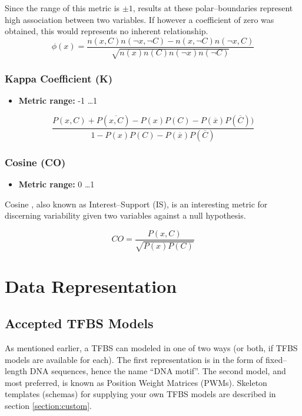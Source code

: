 \documentclass{article}
\begin{document}
Since the range of this metric is $\pm1$, 
results at these polar--boundaries represent high association between two variables. 
If however a coefficient of zero was obtained, this would represents no inherent relationship.
\begin{equation}
	\phi(x) = \frac{n(x,C)n(\neg{x},\neg{C}) - n(x,\neg{C})n(\neg{x},C)} %
		{\sqrt{n(x)n(C)n(\neg{x})n(\neg{C})}} %
\end{equation}

\subsubsection{Kappa Coefficient (K)}
\begin{itemize}
  \item \textbf{Metric range:} -1 \ldots 1
\end{itemize}

\begin{equation}
	\frac{P(x,C)+P(\overline{x,C}) - P(x)P(C) -
        P(\overline{x})P(\overline{C}))}
        {1-P(x)P(C) - P(\overline{x})P(\overline{C})}
\end{equation}

\subsubsection{Cosine (CO)}
\begin{itemize}
  \item \textbf{Metric range:} 0 \ldots 1
\end{itemize}
Cosine \cite{kumar-unpublished-2000}, also known as Interest--Support (IS), is an
interesting metric for discerning variability given two variables against a null hypothesis. 

\begin{equation}
	CO = \frac{P(x,C)} {\sqrt{P(x)P(C)}}
\end{equation}

\section{Data Representation}
\label{section:data_repr}
\subsection{Accepted TFBS Models}
As mentioned earlier, a TFBS can modeled in one of two ways (or both, if 
TFBS models are available for each). 
The first representation is in the form of fixed--length DNA sequences, hence 
the name ``DNA motif''. The second model, and most preferred, is known as Position Weight Matrices (PWMs).
Skeleton templates (schemas) for supplying your own TFBS models are described in section \ref{section:custom}.
\end{document}
